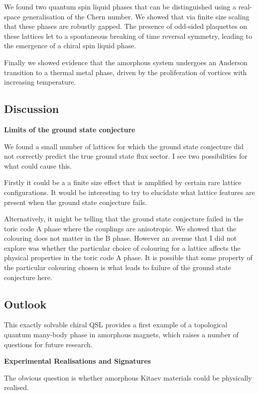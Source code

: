 We found two quantum spin liquid phases that can be distinguished using a real-space generalisation of the Chern number. We showed that via finite size scaling that these phases are robustly gapped. The presence of odd-sided plaquettes on these lattices let to a spontaneous breaking of time reversal symmetry, leading to the emergence of a chiral spin liquid phase.

Finally we showed evidence that the amorphous system undergoes an Anderson transition to a thermal metal phase, driven by the proliferation of vortices with increasing temperature.

\hypertarget{amk-discussion}{%
\subsection{Discussion}\label{amk-discussion}}

\textbf{Limits of the ground state conjecture}

We found a small number of lattices for which the ground state conjecture did not correctly predict the true ground state flux sector. I see two possibilities for what could cause this.

Firstly it could be a a finite size effect that is amplified by certain rare lattice configurations. It would be interesting to try to elucidate what lattice features are present when the ground state conjecture fails.

Alternatively, it might be telling that the ground state conjecture failed in the toric code A phase where the couplings are anisotropic. We showed that the colouring does not matter in the B phase. However an avenue that I did not explore was whether the particular choice of colouring for a lattice affects the physical properties in the toric code A phase. It is possible that some property of the particular colouring chosen is what leads to failure of the ground state conjecture here.

\hypertarget{amk-outlook}{%
\subsection{Outlook}\label{amk-outlook}}

This exactly solvable chiral QSL provides a first example of a topological quantum many-body phase in amorphous magnets, which raises a number of questions for future research.

\textbf{Experimental Realisations and Signatures}

The obvious question is whether amorphous Kitaev materials could be physically realised.


